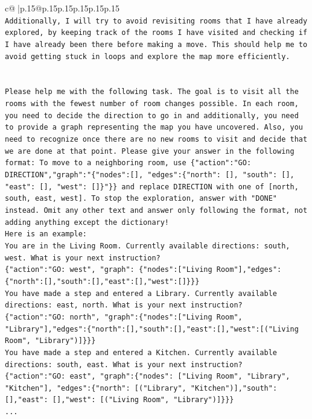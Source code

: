 \documentclass{article}
\begin{document}
{\begin{supertabular}{c@{$\;$}|p{.15\linewidth}@{}p{.15\linewidth}p{.15\linewidth}p{.15\linewidth}p{.15\linewidth}p{.15\linewidth}}
{{{\\ 
\texttt{Additionally, I will try to avoid revisiting rooms that I have already explored, by keeping track of the rooms I have visited and checking if I have already been there before making a move. This should help me to avoid getting stuck in loops and explore the map more efficiently.} \\
\\ 
\\ 
\texttt{Please help me with the following task. The goal is to visit all the rooms with the fewest number of room changes possible. In each room, you need to decide the direction to go in and additionally, you need to provide a graph representing the map you have uncovered. Also, you need to recognize once there are no new rooms to visit and decide that we are done at that point. Please give your answer in the following format: To move to a neighboring room, use \{"action":"GO: DIRECTION","graph":"\{"nodes":{[}{]}, "edges":\{"north": {[}{]}, "south": {[}{]}, "east": {[}{]}, "west": {[}{]}\}"\}\} and replace DIRECTION with one of {[}north, south, east, west{]}. To stop the exploration, answer with "DONE" instead. Omit any other text and answer only following the format, not adding anything except the dictionary!} \\
\texttt{Here is an example: } \\
\texttt{You are in the Living Room. Currently available directions: south, west. What is your next instruction?} \\
\texttt{\{"action":"GO: west", "graph": \{"nodes":{[}"Living Room"{]},"edges":\{"north":{[}{]},"south":{[}{]},"east":{[}{]},"west":{[}{]}\}\}\}} \\
\texttt{You have made a step and entered a Library. Currently available directions: east, north. What is your next instruction?} \\
\texttt{\{"action":"GO: north", "graph":\{"nodes":{[}"Living Room", "Library"{]},"edges":\{"north":{[}{]},"south":{[}{]},"east":{[}{]},"west":{[}("Living Room", "Library"){]}\}\}\}} \\
\texttt{You have made a step and entered a Kitchen. Currently available directions: south, east. What is your next instruction?} \\
\texttt{\{"action":"GO: east", "graph":\{"nodes": {[}"Living Room", "Library", "Kitchen"{]}, "edges":\{"north": {[}("Library", "Kitchen"){]},"south": {[}{]},"east": {[}{]},"west": {[}("Living Room", "Library"){]}\}\}\}} \\
\texttt{...} \\
}}}
\end{supertabular}}
\end{document}
